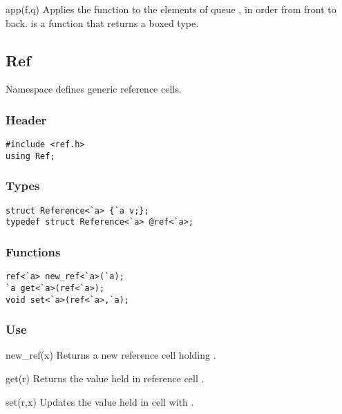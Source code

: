 \begin{defun}{app}{(f,q)}
Applies the function  to the elements of queue , in order
from front to back.   is a function that returns a boxed type.
\end{defun}

\subsection{Ref}

Namespace  defines generic reference cells.

\subsubsection*{Header}
\begin{verbatim}
#include <ref.h>
using Ref;
\end{verbatim}

\subsubsection*{Types}
\begin{verbatim}
struct Reference<`a> {`a v;};
typedef struct Reference<`a> @ref<`a>;
\end{verbatim}

\subsubsection*{Functions}
\begin{verbatim}
ref<`a> new_ref<`a>(`a);
`a get<`a>(ref<`a>);
void set<`a>(ref<`a>,`a);
\end{verbatim}

\subsubsection*{Use}

\begin{defun}{new_ref}{(x)}
Returns a new reference cell holding .
\end{defun}

\begin{defun}{get}{(r)}
Returns the value held in reference cell .
\end{defun}

\begin{defun}{set}{(r,x)}
Updates the value held in cell  with .
\end{defun}


